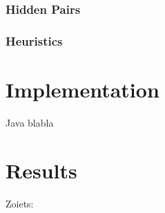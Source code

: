 \documentclass[11pt]{article} %
\begin{document}
\subsubsection{Hidden Pairs}

\subsubsection{Heuristics}

\section{Implementation}

Java blabla

\section{Results}

Zoiets:
\end{document}
